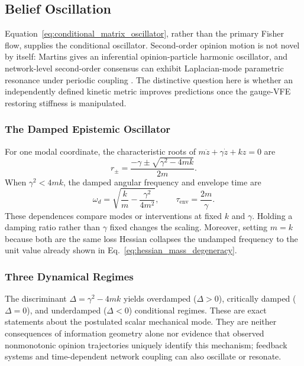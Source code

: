 \documentclass[12pt]{article}
\begin{document}
\subsection{Belief Oscillation}

Equation~\eqref{eq:conditional_matrix_oscillator}, rather than the primary Fisher flow, supplies the conditional oscillator.  Second-order opinion motion is not novel by itself: Martins gives an inferential opinion-particle harmonic oscillator, and network-level second-order consensus can exhibit Laplacian-mode parametric resonance under periodic coupling \citep{Martins2015OpinionParticles,BaumannSokolovTyloo2020}.  The distinctive question here is whether an independently defined kinetic metric improves predictions once the gauge-VFE restoring stiffness is manipulated.

\subsubsection{The Damped Epistemic Oscillator}

For one modal coordinate, the characteristic roots of $m\ddot z+\gamma\dot z+kz=0$ are
\begin{equation}
r_\pm=\frac{-\gamma\pm\sqrt{\gamma^2-4mk}}{2m}.
\label{eq:conditional_modal_roots}
\end{equation}
When $\gamma^2<4mk$, the damped angular frequency and envelope time are
\begin{equation}
\boxed{
\omega_d=\sqrt{\frac{k}{m}-\frac{\gamma^2}{4m^2}},
\qquad
\tau_{\mathrm{env}}=\frac{2m}{\gamma}.}
\label{eq:conditional_damped_frequency}
\end{equation}
These dependences compare modes or interventions at fixed $k$ and $\gamma$.  Holding a damping ratio rather than $\gamma$ fixed changes the scaling.  Moreover, setting $m=k$ because both are the same loss Hessian collapses the undamped frequency to the unit value already shown in Eq.~\eqref{eq:hessian_mass_degeneracy}.

\subsubsection{Three Dynamical Regimes}

The discriminant $\Delta=\gamma^2-4mk$ yields overdamped ($\Delta>0$), critically damped ($\Delta=0$), and underdamped ($\Delta<0$) conditional regimes.  These are exact statements about the postulated scalar mechanical mode.  They are neither consequences of information geometry alone nor evidence that observed nonmonotonic opinion trajectories uniquely identify this mechanism; feedback systems and time-dependent network coupling can also oscillate or resonate.
\end{document}
